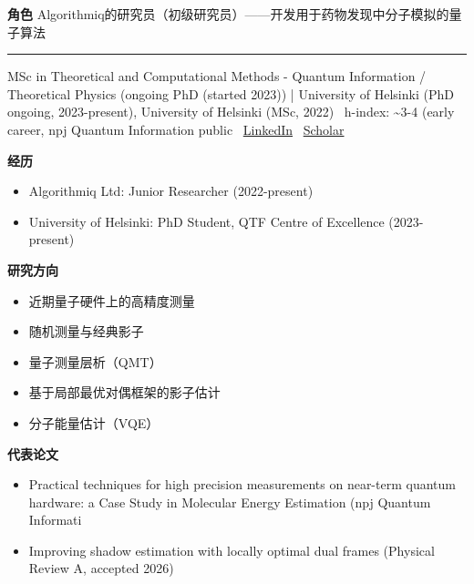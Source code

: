 \par{\footnotesize\color{mainred}\textbf{角色}} {\footnotesize Algorithmiq的研究员（初级研究员）——开发用于药物发现中分子模拟的量子算法}
\vspace{2pt}\hrule\vspace{2pt}
\vspace{4pt}
\par{\footnotesize\color{graytext}MSc in Theoretical and Computational Methods - Quantum Information / Theoretical Physics (ongoing PhD (started 2023)) | University of Helsinki (PhD ongoing, 2023-present), University of Helsinki (MSc, 2022) \textbar\  h-index: \textasciitilde{}3-4 (early career, npj Quantum Information public \textbar\  \href{https://www.linkedin.com/in/keijokorhonen/}{LinkedIn} \textbar\  \href{https://orcid.org/0009-0003-2647-3105}{Scholar}}
\par{\footnotesize\color{mainred}\textbf{经历}}
\begin{itemize}[leftmargin=1.2em,itemsep=0pt,topsep=0pt]
\item {\footnotesize Algorithmiq Ltd: Junior Researcher (2022-present)}
\item {\footnotesize University of Helsinki: PhD Student, QTF Centre of Excellence (2023-present)}
\end{itemize}
\par{\footnotesize\color{mainred}\textbf{研究方向}}
\begin{itemize}[leftmargin=1.2em,itemsep=0pt,topsep=0pt]
\item {\footnotesize 近期量子硬件上的高精度测量}
\item {\footnotesize 随机测量与经典影子}
\item {\footnotesize 量子测量层析（QMT）}
\item {\footnotesize 基于局部最优对偶框架的影子估计}
\item {\footnotesize 分子能量估计（VQE）}
\end{itemize}
\par{\footnotesize\color{mainred}\textbf{代表论文}}
\begin{itemize}[leftmargin=1.2em,itemsep=0pt,topsep=0pt]
\item {\footnotesize Practical techniques for high precision measurements on near-term quantum hardware: a Case Study in Molecular Energy Estimation (npj Quantum Informati}
\item {\footnotesize Improving shadow estimation with locally optimal dual frames (Physical Review A, accepted 2026)}
\end{itemize}
